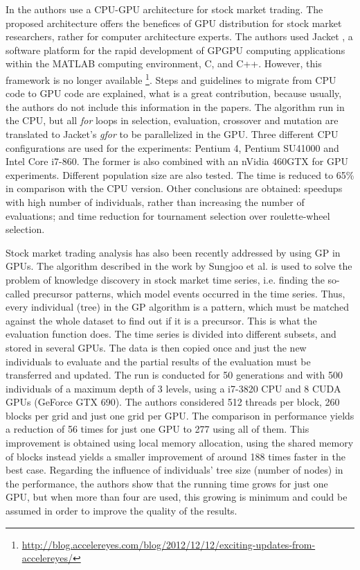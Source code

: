 \documentclass{article}
\begin{document}
In \cite{Contreras:2012:UGA:2150467.2150469} the authors use a CPU-GPU architecture for stock market trading. The proposed architecture offers the benefices of GPU distribution for stock market researchers, rather for computer architecture experts. The authors used Jacket \cite{jacket:Matlab}, a software platform for the rapid development of GPGPU computing applications within the MATLAB computing environment, C, and C++. However, this framework is no longer available \footnote{\url{http://blog.accelereyes.com/blog/2012/12/12/exciting-updates-from-accelereyes/}}. Steps and guidelines to migrate from CPU code to GPU code are explained, what is a great contribution, because usually, the authors do not include this information in the papers. The algorithm run in the CPU, but all  {\em for} loops in selection, evaluation, crossover and mutation are translated to Jacket's {\em gfor} to be parallelized in the GPU. Three different CPU configurations are used for the experiments: Pentium 4, Pentium SU41000 and Intel Core i7-860. The former is also combined with an nVidia 460GTX for GPU experiments. Different population size are also tested. The time is reduced to 65\% in comparison with the CPU version. Other conclusions are obtained: speedups with high number of individuals, rather than increasing the number of evaluations; and time reduction for  tournament selection  over roulette-wheel selection.

Stock market trading analysis has also been recently addressed by
using GP in GPUs. The algorithm described in the work by Sungjoo et
al. \cite{Sungjoo15fastknowledge} is used to solve the problem of
knowledge discovery in stock market time series, i.e. finding the
so-called precursor patterns, which model events occurred in the time
series. Thus, every individual (tree) in the GP algorithm is a
pattern, which must be matched against the whole dataset to find
out if it is a precursor. This is what the evaluation function
does. The time series is divided into different subsets, and stored in
several GPUs. The data is then copied once and just the new
individuals to evaluate and the partial results of the evaluation must
be transferred and updated. %
The run is conducted for 50 generations
and with 500 individuals of a maximum depth of 3 levels, using a
i7-3820 CPU and 8 CUDA GPUs (GeForce GTX 690). %
The authors considered
512 threads per block, 260 blocks per grid and just one grid per
GPU. The comparison in performance yields a reduction of 56 times for
just one GPU to 277 using all of them. This improvement is obtained using
local memory allocation, using the shared memory of blocks instead
yields a smaller improvement of around 188 times faster in the best
case. Regarding the influence of individuals' tree size (number of
nodes) in the performance, the authors show that the running time
grows for just one GPU, but when more than four are used, this growing
is minimum and could be assumed in order to improve the quality of the
results. %
\end{document}
